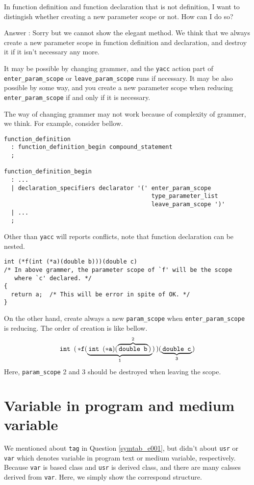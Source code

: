 \begin{QandA}
In function definition and function declaration that is not definition,
I want to distingish whether creating a new parameter scope or not.
How can I do so?

Answer : Sorry but we cannot show the elegant method.
We think that we always create a new parameter scope in
function definition and declaration, and destroy it
if it isn't necessary any more.

It may be possible by changing grammer, and the {\tt{yacc}} action part
of {\tt{enter\_param\_scope}} or {\tt{leave\_param\_scope}} 
runs if necessary.
It may be also possible by some way, and you create a new parameter
scope when reducing {\tt{enter\_param\_scope}} if and only if it is
necessary.

The way of changing grammer may not work because of complexity of
grammer, we think. For example, consider bellow.

\begin{verbatim}
function_definition
  : function_definition_begin compound_statement
  ;

function_definition_begin
  : ...
  | declaration_specifiers declarator '(' enter_param_scope
                                          type_parameter_list
                                          leave_param_scope ')'
  | ...
  ;
\end{verbatim}
Other than {\tt{yacc}} will reports conflicts,
note that function declaration can be nested.
\begin{verbatim}
int (*f(int (*a)(double b)))(double c)
/* In above grammer, the parameter scope of `f' will be the scope
   where `c' declared. */
{
  return a;  /* This will be error in spite of OK. */
}
\end{verbatim}

On the other hand, create always a new {\tt{param\_scope}}
when {\tt{enter\_param\_scope}} is reducing. The order of
creation is like bellow.
\[
{\tt{int\,\,\,(\,*f(
\underbrace{{\tt{\,int\,\,\,(*a)(
\overbrace{\tt{\,double\,\,\,b\,}}^{2})\,}}}_{1})\,)
(\underbrace{\tt{\,double\,\,\,c}\,}_{3})}}
\]
Here,  {\tt{param\_scope}} 2 and 3 should be destroyed
when leaving the scope.
\end{QandA}

\section{Variable in program and medium variable}
\label{symtab_e003}
We mentioned about {\tt{tag}} in Question \ref{symtab_e001}, but
didn't about {\tt{usr}} or {\tt{var}} which denotes
variable in program text or medium variable, respectively.
Because {\tt{var}} is based class and {\tt{usr}} is derived class,
and there are many calsses derived from {\tt{var}}.
Here, we simply show the correspond structure.

